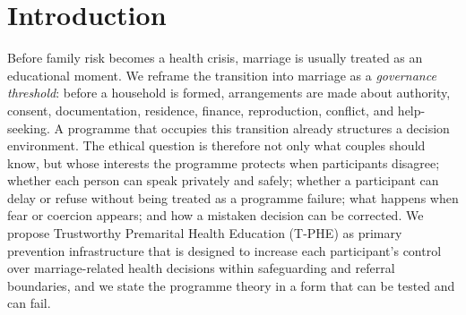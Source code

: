 \documentclass[11pt]{article}
\newcommand{\tphe}{T\mbox{-}PHE}
\begin{document}
\section{Introduction}
Before family risk becomes a health crisis, marriage is usually treated as an educational moment. We reframe the transition into marriage as a \emph{governance threshold}: before a household is formed, arrangements are made about authority, consent, documentation, residence, finance, reproduction, conflict, and help-seeking. A programme that occupies this transition already structures a decision environment. The ethical question is therefore not only what couples should know, but whose interests the programme protects when participants disagree; whether each person can speak privately and safely; whether a participant can delay or refuse without being treated as a programme failure; what happens when fear or coercion appears; and how a mistaken decision can be corrected. We propose Trustworthy Premarital Health Education (\tphe) as primary prevention infrastructure that is designed to increase each participant's control over marriage-related health decisions within safeguarding and referral boundaries, and we state the programme theory in a form that can be tested and can fail.
\end{document}
